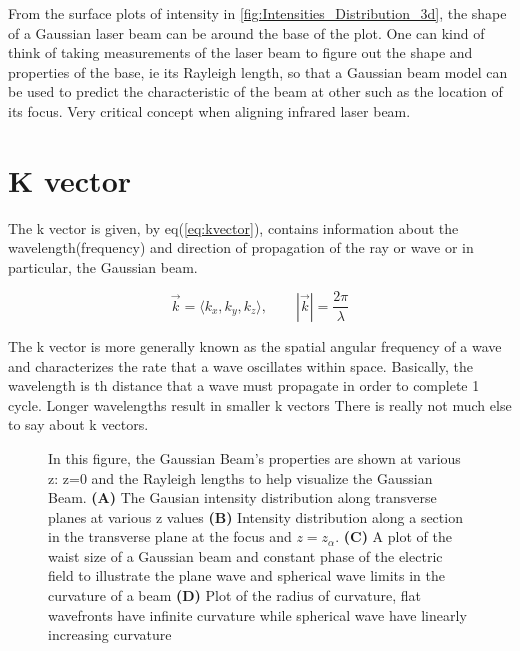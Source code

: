 \documentclass[11pt,a4paper]{book}
\newcommand{\imginput}[1]{} %
\begin{document}
		From the surface plots of intensity in \autoref{fig:Intensities_Distribution_3d}, the shape of a Gaussian laser beam can be around the base of the plot. One can kind of think of taking measurements of the laser beam to figure out the shape and properties of the base, ie its Rayleigh length, so that a Gaussian beam model can be used to predict the characteristic of the beam at other such as the location of its focus. Very critical concept when aligning infrared laser beam.
		
		
	\section{K vector}
		\label{sec:K vector}
		The k vector is given, by eq(\autoref{eq:kvector}), contains information about the wavelength(frequency) and direction of propagation of the ray or wave or in particular, the Gaussian beam.
		
		\begin{equation} 
		\label{eq:kvector}
		\vec{k} = \langle k_x,k_y,k_z \rangle, \qquad |\vec{k}|=\dfrac{2\pi}{\lambda}
		\end{equation} 
		
		\noindent The k vector is more generally known as the spatial angular frequency of a wave and characterizes the rate that a wave oscillates within space. Basically, the wavelength is th distance that a wave must propagate in order to complete 1 cycle. Longer wavelengths result in smaller k vectors There is really not much else to say about k vectors.
		
		\begin{figure} [!ht]
		\centering
		\def\svgwidth{\columnwidth}
		\resizebox{16cm}{!}{\imginput{images/gaus-beam-prop.pdf_tex}}
		\caption{In this figure, the Gaussian Beam's properties are shown at various z: z=0 and the Rayleigh lengths to help visualize the Gaussian Beam.
		\newline
		{\bfseries (A)} The Gausian intensity distribution along transverse planes at various z values
		\newline
		{\bfseries (B)} Intensity distribution along a section in the transverse plane at the focus and  $z=z_\alpha$.
		\newline
		{\bfseries (C)} A plot of the waist size of a Gaussian beam and constant phase of the electric field to illustrate the plane wave and spherical wave limits in the curvature of a beam
		\newline
		{\bfseries (D)} Plot of the radius of curvature, flat wavefronts have infinite curvature while spherical wave have linearly increasing curvature} 
		\label{fig:gaus-beam-prop}
		\end{figure}	
\end{document}
